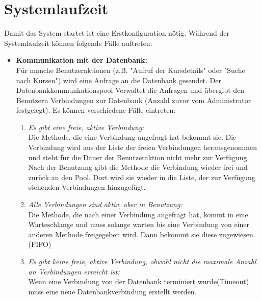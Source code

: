 \section{Systemlaufzeit}
		Damit das System startet ist eine Erstkonfiguration nötig. Während der Systemlaufzeit können folgende Fälle auftreten:
		\begin{itemize}
			\item \textbf{Kommunikation mit der Datenbank:}\\
			 Für manche Benutzeraktionen (z.B. "Aufruf der Kursdetails" oder "Suche nach Kursen") wird eine Anfrage an die Datenbank gesendet. Der Datenbankkommunkationspool Verwaltet die Anfragen und übergibt den Benutzern Verbindungen zur Datenbank (Anzahl zuvor vom Administrator festgelegt). Es können verschiedene Fälle eintreten:
			\begin{enumerate}
				\item \emph{Es gibt eine freie, aktive Verbindung:} \\
				Die Methode, die eine Verbindung angefragt hat bekommt sie. Die Verbindung wird aus der Liste der freien Verbindungen herausgenommen und steht für die Dauer der Benutzeraktion nicht mehr zur Verfügung. Nach der Benutzung gibt die Methode die Verbindung wieder frei und zurück an den Pool. Dort wird sie wieder in die Liste, der zur Verfügung stehenden Verbindungen hinzugefügt.
				\item \emph{Alle Verbindungen sind aktiv, aber in Benutzung:} \\
				Die Methode, die nach einer Verbindung angefragt hat, kommt in eine Warteschlange und muss solange warten bis eine Verbindung von einer anderen Methode freigegeben wird. Dann bekommt sie diese zugewiesen.(FIFO)
				\item \emph{Es gibt keine freie, aktive Verbindung, obwohl nicht die maximale Anzahl an Verbindungen erreicht ist:}\\
				 Wenn eine Verbindung von der Datenbank terminiert wurde(Timeout) muss eine neue Datenbankverbindung erstellt werden.
				
			\end{enumerate}
			

\end{itemize}
